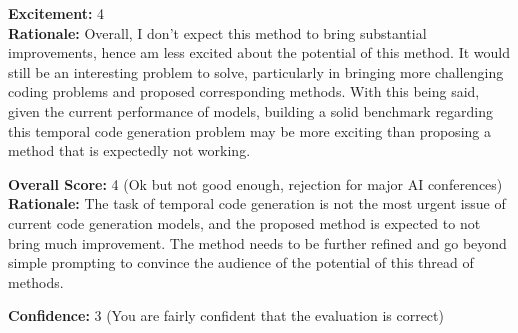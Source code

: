 \begin{tcolorbox}[colback=green!10!white, colframe=green!80!black, title=\textbf{Reviewer 2}]
\vspace{10pt}

\textbf{Excitement:} 4\\
\textbf{Rationale:} Overall, I don't expect this method to bring substantial improvements, hence am less excited about the potential of this method. It would still be an interesting problem to solve, particularly in bringing more challenging coding problems and proposed corresponding methods. With this being said, given the current performance of models, building a solid benchmark regarding this temporal code generation problem may be more exciting than proposing a method that is expectedly not working.

\vspace{10pt}

\textbf{Overall Score:} 4 (Ok but not good enough, rejection for major AI conferences)\\
\textbf{Rationale:} The task of temporal code generation is not the most urgent issue of current code generation models, and the proposed method is expected to not bring much improvement. The method needs to be further refined and go beyond simple prompting to convince the audience of the potential of this thread of methods.

\vspace{10pt}

\textbf{Confidence:} 3 (You are fairly confident that the evaluation is correct)
\end{tcolorbox}

\vspace{20pt}

